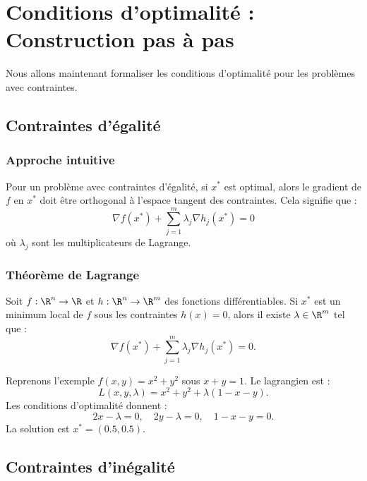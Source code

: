 
\section{Conditions d'optimalité : Construction pas à pas}
Nous allons maintenant formaliser les conditions d'optimalité pour les problèmes avec contraintes.

\subsection{Contraintes d'égalité}
\subsubsection{Approche intuitive}
Pour un problème avec contraintes d'égalité, si \( x^* \) est optimal, alors le gradient de \( f \) en \( x^* \) doit être orthogonal à l'espace tangent des contraintes. Cela signifie que :
\[
\nabla f(x^*) + \sum_{j=1}^m \lambda_j \nabla h_j(x^*) = 0
\]
où \( \lambda_j \) sont les multiplicateurs de Lagrange.

\subsubsection{Théorème de Lagrange}
\begin{theorem}
    Soit \( f : \R^n \to \R \) et \( h : \R^n \to \R^m \) des fonctions différentiables. Si \( x^* \) est un minimum local de \( f \) sous les contraintes \( h(x) = 0 \), alors il existe \( \lambda \in \R^m \) tel que :
    \[
    \nabla f(x^*) + \sum_{j=1}^m \lambda_j \nabla h_j(x^*) = 0.
    \]
\end{theorem}

\begin{example}
    Reprenons l'exemple \( f(x, y) = x^2 + y^2 \) sous \( x + y = 1 \). Le lagrangien est :
    \[
    L(x, y, \lambda) = x^2 + y^2 + \lambda (1 - x - y).
    \]
    Les conditions d'optimalité donnent :
    \[
    2x - \lambda = 0, \quad 2y - \lambda = 0, \quad 1 - x - y = 0.
    \]
    La solution est \( x^* = (0.5, 0.5) \).
\end{example}

\subsection{Contraintes d'inégalité}
